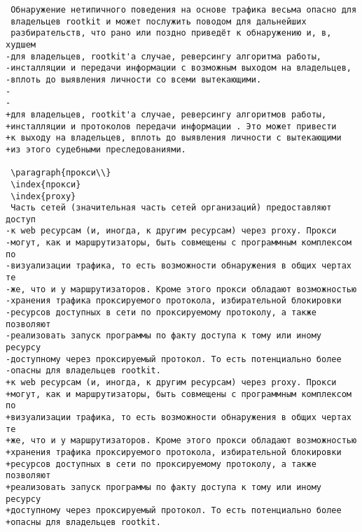 \begin{verbatim}
 Обнаружение нетипичного поведения на основе трафика весьма опасно для
 владельцев rootkit и может послужить поводом для дальнейших
 разбирательств, что рано или поздно приведёт к обнаружению и, в, худшем
-для владельцев, rootkit'а случае, реверсингу алгоритма работы,
-инсталляции и передачи информации с возможным выходом на владельцев,
-вплоть до выявления личности со всеми вытекающими.
-
-
+для владельцев, rootkit'а случае, реверсингу алгоритмов работы,
+инсталляции и протоколов передачи информации . Это может привести
+к выходу на владельцев, вплоть до выявления личности с вытекающими
+из этого судебными преследованиями.

 \paragraph{прокси\\}
 \index{прокси}
 \index{proxy}
 Часть сетей (значительная часть сетей организаций) предоставляют доступ
-к web ресурсам (и, иногда, к другим ресурсам) через proxy. Прокси
-могут, как и маршрутизаторы, быть совмещены с программным комплексом по
-визуализации трафика, то есть возможности обнаружения в общих чертах те
-же, что и у маршрутизаторов. Кроме этого прокси обладают возможностью
-хранения трафика проксируемого протокола, избирательной блокировки
-ресурсов доступных в сети по проксируемому протоколу, а также позволяют
-реализовать запуск программы по факту доступа к тому или иному ресурсу
-доступному через проксируемый протокол. То есть потенциально более
-опасны для владельцев rootkit.
+к web ресурсам (и, иногда, к другим ресурсам) через proxy. Прокси
+могут, как и маршрутизаторы, быть совмещены с программным комплексом по
+визуализации трафика, то есть возможности обнаружения в общих чертах те
+же, что и у маршрутизаторов. Кроме этого прокси обладают возможностью
+хранения трафика проксируемого протокола, избирательной блокировки
+ресурсов доступных в сети по проксируемому протоколу, а также позволяют
+реализовать запуск программы по факту доступа к тому или иному ресурсу
+доступному через проксируемый протокол. То есть потенциально более
+опасны для владельцев rootkit.



\end{verbatim}
